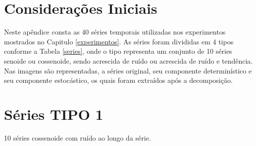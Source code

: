 \label{apendice1}
\section{Considerações Iniciais}
Neste apêndice consta as 40 séries temporais utilizadas nos experimentos mostrados no Capitulo \ref{experimentos}. As séries foram divididas em 4 tipos conforme a Tabela \ref{series}, onde o tipo representa um conjunto de 10 séries senoide ou cossenoide, sendo acrescida de ruído ou acrescida de ruído e tendência.
Nas imagens são representadas, a séries original,   seu componente determinístico e seu componente estocástico, os quais foram extraídos após a decomposição.
\section{Séries TIPO 1}
10 séries cossenoide com ruído ao longo da série.
\graphicspath{{imagens/}}
